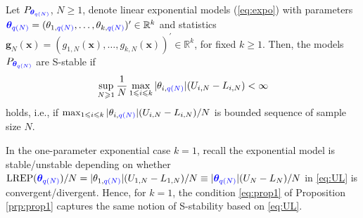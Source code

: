 \documentclass[numbib]{imamat}
\theoremstyle{theorem}
\theoremstyle{lemma}
\theoremstyle{example}
\theoremstyle{corollary}
\theoremstyle{definition}
\theoremstyle{remark}
\theoremstyle{approximation}
\theoremstyle{scheme}
\newcommand{\REP}{\mathrm{LREP}}
\newcommand{\thetaidx}{q(N)}
\newcommand{\thetaN}{\boldsymbol \theta_{\thetaidx}}
\newcommand{\ak}[1]{{\color{blue} #1}}
\let\BeginKnitrBlock\begin \let\EndKnitrBlock\end
\begin{document}
\BeginKnitrBlock{proposition}
\protect\hypertarget{prp:prop1}{}{\label{prp:prop1} }Let \(P_{\ak{\thetaN}}\), \(N \geq 1\), denote linear exponential models (\ref{eq:expo}) with parameters \(\ak{\thetaN} = (\theta_{1,\ak{\thetaidx}},\ldots,\theta_{k,\ak{\thetaidx}})^\prime \in \mathbb{R}^k\) and statistics \(\boldsymbol g_N(\boldsymbol x) = (g_{1,N}(\boldsymbol x),\ldots, g_{k,N}(\boldsymbol x))^\prime \in \mathbb{R}^k\), for fixed \(k \geq 1\). Then, the models \(P_{\ak{\thetaN}}\) are S-stable if
\begin{equation}
\label{eq:prop1}
\sup_{N \geq 1}\frac{1}{N} \max_{1 \leq i \leq k }|\theta_{i,\ak{\thetaidx}}|(U_{i,N}-L_{i,N})<\infty
\end{equation}
holds, i.e., if \(\max_{1 \leq i \leq k } |\theta_{i,\ak{\thetaidx}}|(U_{i,N}-L_{i,N})/N\) is bounded sequence of sample size \(N\).
\EndKnitrBlock{proposition}

\BeginKnitrBlock{remark}
\iffalse{} {Remark. } \fi{}In the one-parameter exponential case \(k=1\), recall the exponential model is stable/unstable depending on whether \(\REP(\ak{\thetaN})/N = |\theta_{1,\ak{\thetaidx}}|(U_{1,N}-L_{1,N})/N \equiv | \ak{\thetaN}|(U_{N}-L_{N})/N\) in \eqref{eq:UL} is convergent/divergent. Hence, for \(k=1\), the condition \eqref{eq:prop1} of Proposition \ref{prp:prop1} captures the same notion of S-stability based on \eqref{eq:UL}.
\EndKnitrBlock{remark}
\end{document}

